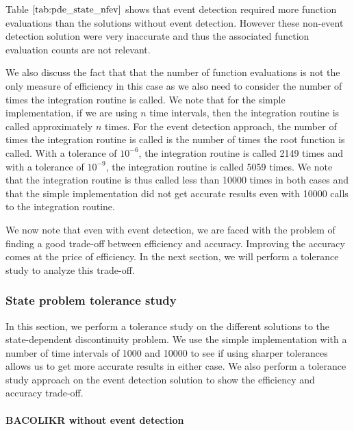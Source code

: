 \documentclass{article}
\begin{document}
Table $\ref{tab:pde_state_nfev}$ shows that event detection required more function evaluations than the solutions without event detection. However these non-event detection solution were very inaccurate and thus the associated function evaluation counts are not relevant. 

We also discuss the fact that that the number of function evaluations is not the only measure of efficiency in this case as we also need to consider the number of times the integration routine is called. We note that for the simple implementation, if we are using $n$ time intervals, then the integration routine is called approximately $n$ times. For the event detection approach, the number of times the integration routine is called is the number of times the root function is called. With a tolerance of $10^{-6}$, the integration routine is called 2149 times and with a tolerance of $10^{-9}$, the integration routine is called 5059 times. We note that the integration routine is thus called less than 10000 times in both cases and that the simple implementation did not get accurate results even with 10000 calls to the integration routine.

We now note that even with event detection, we are faced with the problem of finding a good trade-off between efficiency and accuracy. Improving the accuracy comes at the price of efficiency. In the next section, we will perform a tolerance study to analyze this trade-off.

\subsubsection{State problem tolerance study}
\label{subsubsection:pde_state_tol_study}
In this section, we perform a tolerance study on the different solutions to the state-dependent discontinuity problem. We use the simple implementation with a number of time intervals of 1000 and 10000 to see if using sharper tolerances allows us to get more accurate results in either case. We also perform a tolerance study approach on the event detection solution to show the efficiency and accuracy trade-off.

\paragraph{BACOLIKR without event detection}
\end{document}
